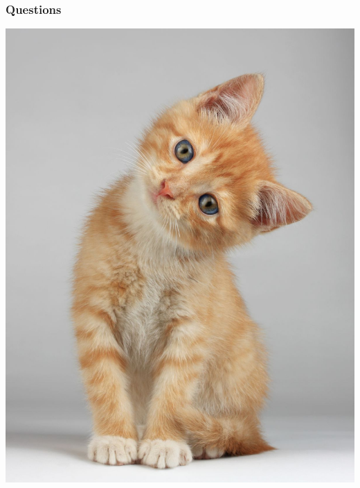 \documentclass[aspectratio=169]{beamer}
\begin{document}
		\begin{frame}
			\frametitle{Questions}

			\vspace*{-0.12cm}
			\centerline{\includegraphics[height=0.85\paperheight, keepaspectratio]{../figures/question_kitten.jpg}}
		\end{frame}
\end{document}
